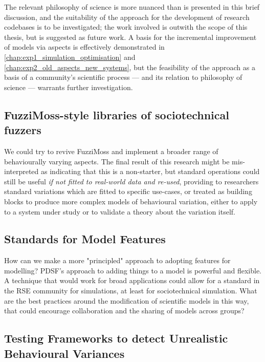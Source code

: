 The relevant philosophy of science is more nuanced than is presented in this
brief discussion, and the suitability of the approach for the development of
research codebases is to be investigated; the work involved is outwith the scope
of this thesis, but is suggested as future work. A basis for the incremental
improvement of models via aspects is effectively demonstrated in
\cref{chap:exp1_simulation_optimisation} and
\cref{chap:exp2_old_aspects_new_systems}, but the feasibility of the approach as
a basis of a community's scientific process --- and its relation to philosophy
of science --- warrants further investigation.



\subsection{FuzziMoss-style libraries of sociotechnical
fuzzers}\label{future_work_revive_fuzzimoss}

We could try to revive FuzziMoss and implement a broader range of behaviourally
varying aspects. The final result of this research might be mis-interpreted as
indicating that this is a non-starter, but standard operations could still be
useful \emph{if not fitted to real-world data and re-used}, providing to
researchers standard variations which are fitted to specific use-cases, or
treated as building blocks to produce more complex models of behavioural
variation, either to apply to a system under study or to validate a theory about
the variation itself.


\subsection{Standards for Model Features}\label{subsec:standard_aosm_techniques}

How can we make a more "principled" approach to adopting features for modelling?
PDSF's approach to adding things to a model is powerful and flexible. A
technique that would work for broad applications could allow for a standard in
the RSE community for simulations, at least for sociotechnical simulation. What
are the best practices around the modification of scientific models in this way,
that could encourage collaboration and the sharing of models across groups?


\subsection{Testing Frameworks to detect Unrealistic Behavioural Variances}\label{sciunits_for_unrealistic_states}

